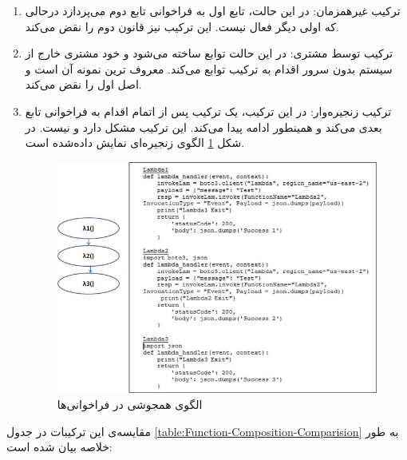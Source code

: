\begin{enumerate}
	
	\item ترکیب غیرهمزمان: در این حالت،‌ تابع اول به فراخوانی تابع دوم می‌پردازد درحالی که اولی دیگر فعال نیست. این ترکیب نیز قانون دوم  را نقض می‌کند. 
	
	\item ترکیب توسط مشتری: در این حالت توابع ساخته می‌شود و خود مشتری خارج از سیستم بدون سرور اقدام به ترکیب توابع می‌کند. معروف ترین نمونه آن  است و اصل اول را نقض می‌کند. 
	
	\item ترکیب زنجیره‌وار: در این ترکیب، یک ترکیب پس از اتمام اقدام به فراخوانی تابع بعدی می‌کند و همینطور ادامه پیدا می‌کند. این ترکیب مشکل  دارد و  نیست. در شکل \ref{fig:FaaS-Chaining-Pattern} الگوی زنجیره‌ای نمایش داده‌شده است. 
	
	\begin{figure}
		\centering
		\includegraphics[width=\linewidth]{figs/FaaS-Chaining-Pattern}
		\caption {الگوی همجوشی در فراخوانی‌ها}
		\label{fig:FaaS-Chaining-Pattern}
	\end{figure}
	
\end{enumerate}

مقایسه‌ی این ترکیبات در جدول \ref{table:Function-Composition-Comparision} به طور خلاصه بیان شده است: \cite{baldini2017serverless}‌

